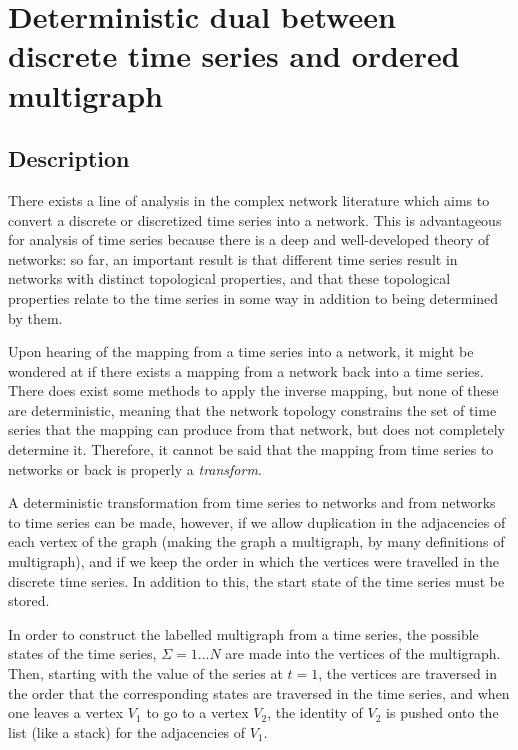 \documentclass[12pt]{article}
\begin{document}
\section{Deterministic dual between discrete time series and ordered multigraph}

\subsection{Description}

There exists a line of analysis in the complex network literature which aims to convert a discrete or discretized time series into a network. This is advantageous for analysis of time series because there is a deep and well-developed theory of networks: so far, an important result is that different time series result in networks with distinct topological properties, and that these topological properties relate to the time series in some way in addition to being determined by them\cite{campanharo}.


Upon hearing of the mapping from a time series into a network, it might be wondered at if there exists a mapping from a network back into a time series. There does exist some methods to apply the inverse mapping, but none of these are deterministic, meaning that the network topology constrains the set of time series that the mapping can produce from that network, but does not completely determine it\cite{campanharo}. Therefore, it cannot be said that the mapping from time series to networks or back is properly a \emph{transform}.


A deterministic transformation from time series to networks and from networks to time series can be made, however, if we allow duplication in the adjacencies of each vertex of the graph (making the graph a multigraph, by many definitions of multigraph\cite{multigraph}), and if we keep the order in which the vertices were travelled in the discrete time series. In addition to this, the start state of the time series must be stored.

In order to construct the labelled multigraph from a time series, the possible states of the time series, $\Sigma = {1 ... N}$ are made into the vertices of the multigraph. Then, starting with the value of the series at $t =1$, the vertices are traversed in the order that the corresponding states are traversed in the time series, and when one leaves a vertex $V_1$ to go to a vertex $V_2$, the identity of $V_2$ is pushed onto the list (like a stack) for the adjacencies of $V_1$.
\end{document}
